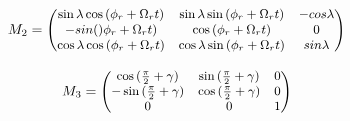 \documentclass{ttuthes2007}
\begin{document}
\begin{equation}
\small
M_2=
\begin{pmatrix}
\sin{\lambda}\cos{(\phi_r+\Omega_rt)} & \sin{\lambda}\sin{(\phi_r+\Omega_rt)} 
& -cos{\lambda}\\
-sin{()\phi_r+\Omega_rt)} & \cos{(\phi_r+\Omega_rt)} & 0\\
\cos{\lambda}\cos{(\phi_r+\Omega_rt)}  & \cos{\lambda}\sin{(\phi_r+\Omega_rt)} 
& sin{\lambda}
\end{pmatrix}
\end{equation}

\begin{equation}
\small
M_3=
\begin{pmatrix}
\cos{(\frac{\pi}{2}+\gamma)} & \sin{(\frac{\pi}{2}+\gamma)} & 0\\
-\sin{(\frac{\pi}{2}+\gamma)} & \cos{(\frac{\pi}{2}+\gamma)} & 0\\
0 & 0 & 1
\end{pmatrix}
\end{equation}
\end{document}
